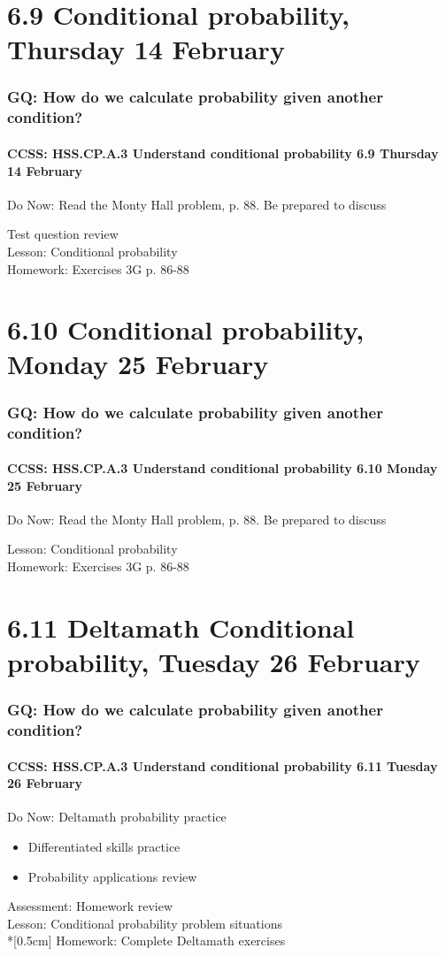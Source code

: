\documentclass{beamer}
\begin{document}
\section{6.9 Conditional probability, Thursday 14 February}
  \frame
  {
    \frametitle{GQ: How do we calculate probability given another condition?}
    \framesubtitle{CCSS: HSS.CP.A.3 Understand conditional probability \hfill \alert{6.9 Thursday 14 February}}

    \begin{block}{Do Now: Read the Monty Hall problem, p. 88. Be prepared to discuss}
    \end{block}
    Test question review\\
    Lesson: Conditional probability\\[0.5cm]
    Homework: Exercises 3G p. 86-88
  }

\section{6.10 Conditional probability, Monday 25 February}
  \frame
  {
    \frametitle{GQ: How do we calculate probability given another condition?}
    \framesubtitle{CCSS: HSS.CP.A.3 Understand conditional probability \hfill \alert{6.10 Monday 25 February}}

    \begin{block}{Do Now: Read the Monty Hall problem, p. 88. Be prepared to discuss}
    \end{block}
    Lesson: Conditional probability\\[0.5cm]
    Homework: Exercises 3G p. 86-88
  }

\section{6.11 Deltamath Conditional probability, Tuesday 26 February}
  \frame
  {
    \frametitle{GQ: How do we calculate probability given another condition?}
    \framesubtitle{CCSS: HSS.CP.A.3 Understand conditional probability \hfill \alert{6.11 Tuesday 26 February}}

    \begin{block}{Do Now: Deltamath probability practice}
      \begin{itemize}
        \item Differentiated skills practice
        \item Probability applications review
      \end{itemize}
    \end{block}
    Assessment: Homework review\\
    Lesson: Conditional probability problem situations\\*[0.5cm]
    Homework: Complete Deltamath exercises
  }
\end{document}
